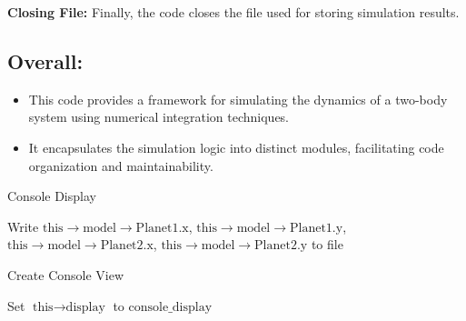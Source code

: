 \documentclass{article}
\begin{document}
\textbf{Closing File:}
Finally, the code closes the file used for storing simulation results.

\subsection*{Overall:}
\begin{itemize}[label=-]
    \item This code provides a framework for simulating the dynamics of a two-body system using numerical integration techniques.
    \item It encapsulates the simulation logic into distinct modules, facilitating code organization and maintainability.
\end{itemize}

\begin{algorithm}
\caption{Console Display}
\begin{algorithmic}[1]
    \State Write $\text{this} \rightarrow \text{model} \rightarrow \text{Planet1.x}$, $\text{this} \rightarrow \text{model} \rightarrow \text{Planet1.y}$, $\text{this} \rightarrow \text{model} \rightarrow \text{Planet2.x}$, $\text{this} \rightarrow \text{model} \rightarrow \text{Planet2.y}$ to file
\EndFunction
\end{algorithmic}
\end{algorithm}

\begin{algorithm}
\caption{Create Console View}
\begin{algorithmic}[1]
    \State Set $\text{this} \rightarrow \text{display}$ to $\text{console\_display}$
\EndFunction
\end{algorithmic}
\end{algorithm}
\end{document}
